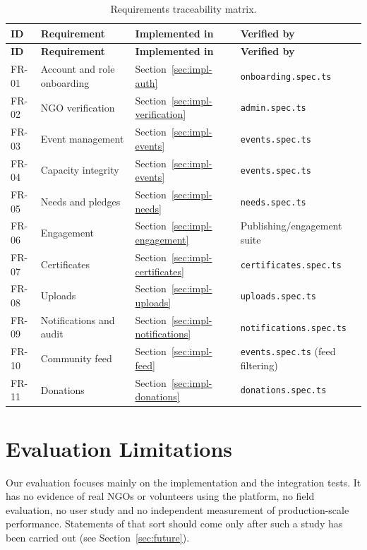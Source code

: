 \begin{longtable}{|p{}|p{}|p{}|p{}|}
\caption{Requirements traceability matrix.}\label{tab:traceability}\\\hline
\textbf{ID} & \textbf{Requirement} & \textbf{Implemented in} & \textbf{Verified by}\\\hline
\endfirsthead
\hline
\textbf{ID} & \textbf{Requirement} & \textbf{Implemented in} & \textbf{Verified by}\\\hline
\endhead
FR-01 & Account and role onboarding & Section~\ref{sec:impl-auth} & \texttt{onboarding.spec.ts}\\\hline
FR-02 & NGO verification & Section~\ref{sec:impl-verification} & \texttt{admin.spec.ts}\\\hline
FR-03 & Event management & Section~\ref{sec:impl-events} & \texttt{events.spec.ts}\\\hline
FR-04 & Capacity integrity & Section~\ref{sec:impl-events} & \texttt{events.spec.ts}\\\hline
FR-05 & Needs and pledges & Section~\ref{sec:impl-needs} & \texttt{needs.spec.ts}\\\hline
FR-06 & Engagement & Section~\ref{sec:impl-engagement} & Publishing/engagement suite\\\hline
FR-07 & Certificates & Section~\ref{sec:impl-certificates} & \texttt{certificates.spec.ts}\\\hline
FR-08 & Uploads & Section~\ref{sec:impl-uploads} & \texttt{uploads.spec.ts}\\\hline
FR-09 & Notifications and audit & Section~\ref{sec:impl-notifications} & \texttt{notifications.spec.ts}\\\hline
FR-10 & Community feed & Section~\ref{sec:impl-feed} & \texttt{events.spec.ts} (feed filtering)\\\hline
FR-11 & Donations & Section~\ref{sec:impl-donations} & \texttt{donations.spec.ts}\\\hline
\end{longtable}

\section{Evaluation Limitations}
Our evaluation focuses mainly on the implementation and the integration tests. It has no evidence of real NGOs or volunteers using the platform, no field evaluation, no user study and no independent measurement of production-scale performance. Statements of that sort should come only after such a study has been carried out (see Section~\ref{sec:future}).

